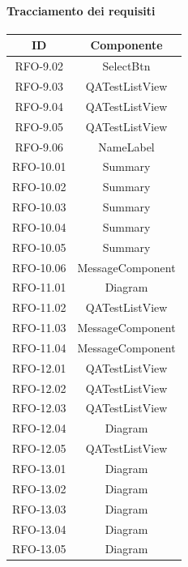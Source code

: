\paragraph{Tracciamento dei requisiti}
\begin{tabularx}{\textwidth}{|c|c|}
    \hline
    \textbf{ID} & \textbf{Componente} \\
    \hline
        RFO-9.02 & SelectBtn \\
    \hline
        RFO-9.03 & QATestListView \\
    \hline
        RFO-9.04 & QATestListView \\
    \hline
        RFO-9.05 & QATestListView \\
    \hline
        RFO-9.06 & NameLabel \\
    \hline
        RFO-10.01 & Summary \\
    \hline
        RFO-10.02 & Summary \\
    \hline
        RFO-10.03 & Summary \\
    \hline
        RFO-10.04 & Summary \\
    \hline
        RFO-10.05 & Summary \\
    \hline
        RFO-10.06 & MessageComponent \\
    \hline
        RFO-11.01 & Diagram \\
    \hline
        RFO-11.02 & QATestListView \\
    \hline
        RFO-11.03 & MessageComponent \\
    \hline
        RFO-11.04 & MessageComponent \\
    \hline
        RFO-12.01 & QATestListView \\
    \hline
        RFO-12.02 & QATestListView \\
    \hline
        RFO-12.03 & QATestListView \\
    \hline
        RFO-12.04 & Diagram \\
    \hline
        RFO-12.05 & QATestListView \\
    \hline
        RFO-13.01 & Diagram \\
    \hline
        RFO-13.02 & Diagram \\
    \hline
        RFO-13.03 & Diagram \\
    \hline
        RFO-13.04 & Diagram \\
    \hline
        RFO-13.05 & Diagram \\
    \hline
\end{tabularx}